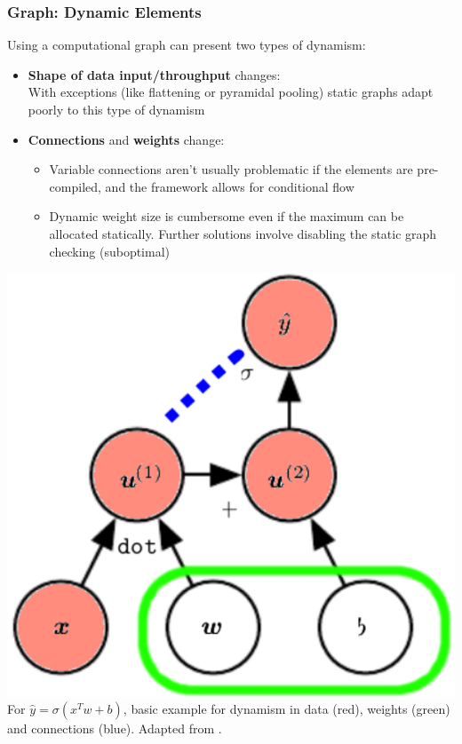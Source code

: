 \documentclass[hyperref={pdfpagelabels=false}]{beamer}
\begin{document}
     \begin{frame}
       \frametitle{Graph: Dynamic Elements}
       \vspace{-2mm}
       Using a computational graph can present two types of dynamism:
       \begin{itemize}[<.->]
       \item \small{\textbf{Shape of data input/throughput} changes:\\
         With exceptions (like flattening or pyramidal pooling) static graphs adapt poorly to this type of dynamism}
       \item \small{\textbf{Connections} and \textbf{weights} change:}
         \begin{itemize}[<.->]
         \item \small{Variable connections aren't usually problematic if the elements are pre-compiled, and the framework allows for conditional flow}
         \item \small{Dynamic weight size is cumbersome even if the maximum can be allocated statically. Further solutions involve disabling the static graph checking (suboptimal)}
         \end{itemize}
       \end{itemize}
       \vspace{-3mm}
       \begin{center}
         \includegraphics[scale=0.15]{logreg_graph_205.png}
         \scriptsize{\\For $\hat{y}=\sigma(x^Tw+b)$, basic example for dynamism in data (red), weights (green) and connections (blue). Adapted from \cite[p.205]{goodfellow}.}
       \end{center}
     \end{frame}
\end{document}
